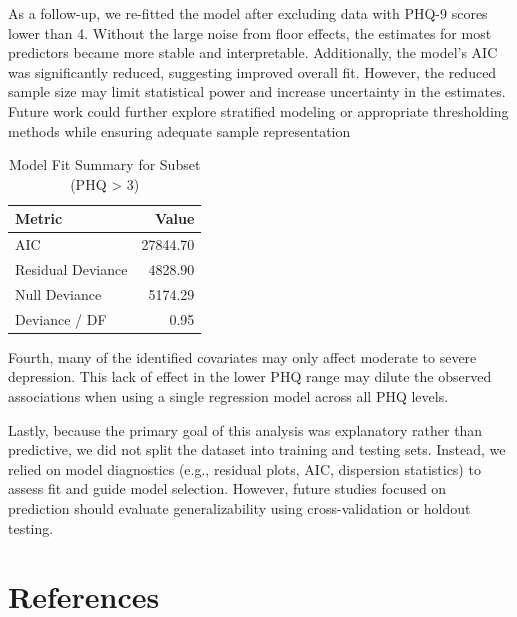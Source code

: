 \documentclass[
  11pt,
]{article}
\begin{document}
As a follow-up, we re-fitted the model after excluding data with PHQ-9 scores lower than 4. Without the large noise from floor effects, the estimates for most predictors became more stable and interpretable. Additionally, the model's AIC was significantly reduced, suggesting improved overall fit. However, the reduced sample size may limit statistical power and increase uncertainty in the estimates. Future work could further explore stratified modeling or appropriate thresholding methods while ensuring adequate sample representation

\begin{table}[!h]
\centering
\caption{\label{tab:phqdata3}Model Fit Summary for Subset (PHQ > 3)}
\centering
\begin{tabular}[t]{l|r}
\hline
Metric & Value\\
\hline
AIC & 27844.70\\
\hline
Residual Deviance & 4828.90\\
\hline
Null Deviance & 5174.29\\
\hline
Deviance / DF & 0.95\\
\hline
\end{tabular}
\end{table}

Fourth, many of the identified covariates may only affect moderate to severe depression. This lack of effect in the lower PHQ range may dilute the observed associations when using a single regression model across all PHQ levels.

Lastly, because the primary goal of this analysis was explanatory rather than predictive, we did not split the dataset into training and testing sets. Instead, we relied on model diagnostics (e.g., residual plots, AIC, dispersion statistics) to assess fit and guide model selection. However, future studies focused on prediction should evaluate generalizability using cross-validation or holdout testing.

\section{References}\label{references}
\end{document}
